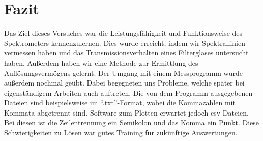 

\chapter{Fazit}
\label{chap:fazit}
Das Ziel dieses Versuches war die Leistungsfähigkeit und Funktionsweise des Spektrometers kennenzulernen. Dies wurde erreicht, indem wir Spektrallinien vermessen haben und das Transmissionsverhalten eines Filterglases untersucht haben. Außerdem haben wir eine Methode zur Ermittlung des Auflösungsvermögens gelernt. Der Umgang mit einem Messprogramm wurde außerdem nochmal geübt. Dabei begegneten uns Probleme, welche später bei eigenständigem Arbeiten auch auftreten. Die von dem Programm ausgegebenen Dateien sind beispielsweise im "`.txt"'-Format, wobei die Kommazahlen mit Kommata abgetrennt sind. Software zum Plotten erwartet jedoch csv-Dateien. Bei diesen ist die Zeilentrennung ein Semikolon und das Komma ein Punkt. Diese Schwierigkeiten zu Lösen war gutes Training für zukünftige Auswertungen.

